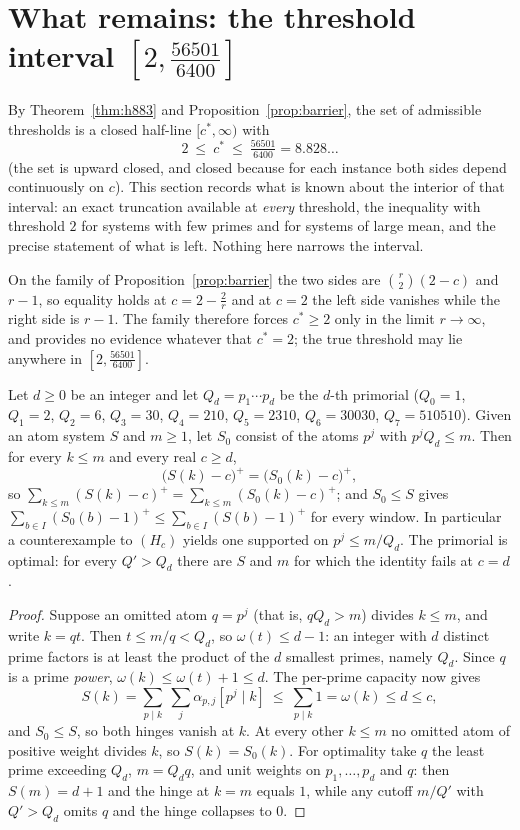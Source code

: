 \section{What remains: the threshold interval $[2,\tfrac{56501}{6400}]$}\label{sec:remains}

By Theorem~\ref{thm:h883} and Proposition~\ref{prop:barrier}, the set of admissible thresholds is a closed half-line
$[c^*,\infty)$ with
\[
2\ \le\ c^*\ \le\ \tfrac{56501}{6400}=8.828\ldots
\]
(the set is upward closed, and closed because for each instance both sides depend continuously on $c$). This section
records what is known about the interior of that interval: an exact truncation available at \emph{every} threshold, the
inequality with threshold $2$ for systems with few primes and for systems of large mean, and the precise statement of
what is left. Nothing here narrows the interval.

\begin{remark}\label{rem:notight}
On the family of Proposition~\ref{prop:barrier} the two sides are $\binom r2(2-c)$ and $r-1$, so equality holds at
$c=2-\tfrac2r$ and at $c=2$ the left side vanishes while the right side is $r-1$. The family therefore forces
$c^*\ge2$ only in the limit $r\to\infty$, and provides no evidence whatever that $c^*=2$; the true threshold may lie
anywhere in $[2,\tfrac{56501}{6400}]$.
\end{remark}

\begin{lemma}\label{lem:primorial}
Let $d\ge0$ be an integer and let $Q_d=p_1\cdots p_d$ be the $d$-th primorial ($Q_0=1$, $Q_1=2$, $Q_2=6$, $Q_3=30$,
$Q_4=210$, $Q_5=2310$, $Q_6=30030$, $Q_7=510510$). Given an atom system $S$ and $m\ge1$, let $S_0$ consist of the atoms
$p^j$ with $p^jQ_d\le m$. Then for every $k\le m$ and every real $c\ge d$,
\[
\bigl(S(k)-c\bigr)^+=\bigl(S_0(k)-c\bigr)^+ ,
\]
so $\sum_{k\le m}(S(k)-c)^+=\sum_{k\le m}(S_0(k)-c)^+$; and $S_0\le S$ gives
$\sum_{b\in I}(S_0(b)-1)^+\le\sum_{b\in I}(S(b)-1)^+$ for every window. In particular a counterexample to $(H_c)$
yields one supported on $p^j\le m/Q_d$. The primorial is optimal: for every $Q'>Q_d$ there are $S$ and $m$ for which
the identity fails at $c=d$.
\end{lemma}
\begin{proof}
Suppose an omitted atom $q=p^j$ (that is, $qQ_d>m$) divides $k\le m$, and write $k=qt$. Then $t\le m/q<Q_d$, so
$\omega(t)\le d-1$: an integer with $d$ distinct prime factors is at least the product of the $d$ smallest primes,
namely $Q_d$. Since $q$ is a prime \emph{power}, $\omega(k)\le\omega(t)+1\le d$. The per-prime capacity now gives
\[
S(k)=\sum_{p\mid k}\ \sum_j\alpha_{p,j}[p^j\mid k]\ \le\ \sum_{p\mid k}1=\omega(k)\le d\le c ,
\]
and $S_0\le S$, so both hinges vanish at $k$. At every other $k\le m$ no omitted atom of positive weight divides $k$,
so $S(k)=S_0(k)$. For optimality take $q$ the least prime exceeding $Q_d$, $m=Q_dq$, and unit weights on
$p_1,\dots,p_d$ and $q$: then $S(m)=d+1$ and the hinge at $k=m$ equals $1$, while any cutoff $m/Q'$ with $Q'>Q_d$
omits $q$ and the hinge collapses to $0$.
\end{proof}

